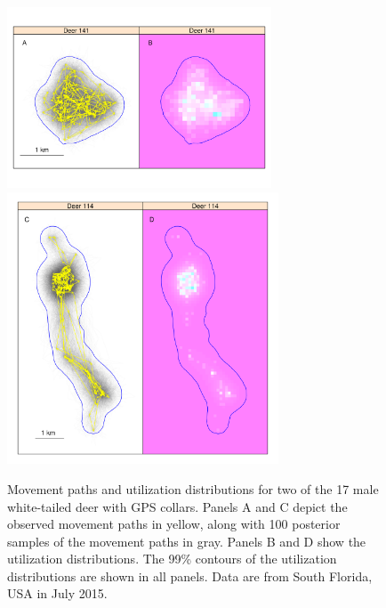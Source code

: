 \documentclass[12pt]{article}
\begin{document}
\clearpage


\begin{figure}[h!]
  \centering
  \includegraphics[width=0.7\textwidth]{figs/UD-path-141} \\
  \vspace{-0.8cm}
  \includegraphics[width=0.72\textwidth]{figs/UD-path-114} \\
  \caption{Movement paths and utilization distributions for two of the
    17 male white-tailed deer with GPS collars. Panels A and C depict the observed
    movement paths in yellow, along with 100 posterior samples of the
    movement paths in gray. Panels B and D show the
    utilization distributions. The 99\% contours of the utilization
    distributions are shown in all panels. Data are from South
    Florida, USA in July 2015.} 
  \label{fig:path-ud}
\end{figure}
\end{document}
